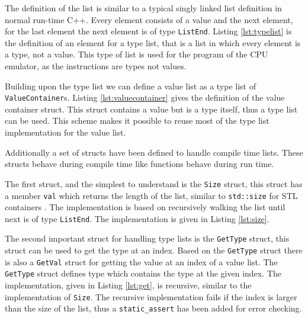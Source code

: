 The definition of the list is similar to a typical singly linked list definition in normal run-time C++. Every
element consists of a value and the next element, for the last element the next element is of type \lstinline{ListEnd}.
Listing \ref{lst:typelist} is the definition of an element for a type list, that is a list in which every element is a type, not
a value. This type of list is used for the program of the CPU emulator, as the instructions are types not values.



Building upon the type list we can define a value list as a type list of \lstinline{ValueContainer}s. Listing
\ref{lst:valuecontainer} gives the definition of the value container struct. This struct contains a value but
is a type itself, thus a type list can be used. This scheme makes it possible to reuse most of the type list
implementation for the value list.



Additionally a set of structs have been defined to handle compile time lists. These structs behave during compile time like 
functions behave during run time. 

The first struct, and the simplest to understand is the \lstinline{Size} struct, this
struct has a member \lstinline{val} which returns the length of the list, similar to 
\lstinline{std::size} for STL containers \cite{stdsize}. The implementation is based on recursively 
walking the list until next is of type \lstinline{ListEnd}. The implementation is given
in Listing \ref{lst:size}.



The second important struct for handling type lists is the \lstinline{GetType} struct,
this struct can be used to get the type at an index. Based on the \lstinline{GetType}
struct there is also a \lstinline{GetVal} struct for getting the value at an index of
a value list. The \lstinline{GetType} struct defines type which contains the type
at the given index. The implementation, given in Listing \ref{lst:get}, 
is recursive, similar to the implementation of \lstinline{Size}.
The recursive implementation fails if the index is larger than the size of the list, 
thus a \lstinline{static_assert} has been added for error checking.




